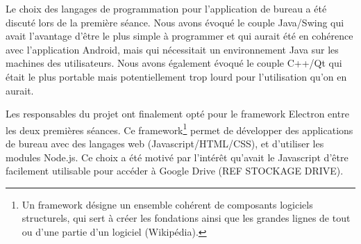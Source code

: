 \par
Le choix des langages de programmation pour l'application de bureau a été discuté lors de la première séance. Nous avons évoqué le couple Java/Swing qui avait l'avantage d'être le plus simple à programmer et qui aurait été en cohérence avec l'application Android, mais qui nécessitait un environnement Java sur les machines des utilisateurs. Nous avons également évoqué le couple C++/Qt qui était le plus portable mais potentiellement trop lourd pour l'utilisation qu'on en aurait. 
\par
Les responsables du projet ont finalement opté pour le framework Electron entre les deux premières séances. Ce framework\footnote{Un framework désigne un ensemble cohérent de composants logiciels structurels, qui sert à créer les fondations ainsi que les grandes lignes de tout ou d’une partie d'un logiciel (Wikipédia).} permet de développer des applications de bureau avec des langages web (Javascript/HTML/CSS), et d'utiliser les modules Node.js. Ce choix a été motivé par l'intérêt qu'avait le Javascript d'être facilement utilisable pour accéder à Google Drive (REF STOCKAGE DRIVE).